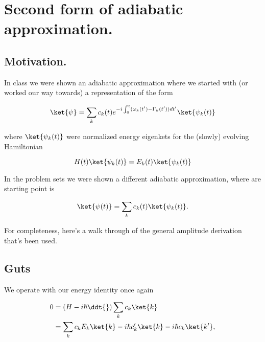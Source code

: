 
%

\chapter{Second form of adiabatic approximation.}
\label{chap:adiabaticApproximation}
{}
\date{Dec 11, 2011}

\beginArtWithToc

\section{Motivation.}

In class we were shown an adiabatic approximation where we started with (or worked our way towards) a representation of the form

\begin{equation}\label{eqn:adiabaticApproximation:10}
\ket{\psi} = \sum_k c_k(t) e^{-i \int_0^t (\omega_k(t') - \Gamma_k(t')) dt' } \ket{\psi_k(t)}
\end{equation}

where $\ket{\psi_k(t)}$ were normalized energy eigenkets for the (slowly) evolving Hamiltonian

\begin{equation}\label{eqn:adiabaticApproximation:30}
H(t) \ket{\psi_k(t)} = E_k(t) \ket{\psi_k(t)}
\end{equation}

In the problem sets we were shown a different adiabatic approximation, where are starting point is 

\begin{equation}\label{eqn:adiabaticApproximation:50}
\ket{\psi(t)} = \sum_k c_k(t) \ket{\psi_k(t)}.
\end{equation}

For completeness, here's a walk through of the general amplitude derivation that's been used.

\section{Guts}

We operate with our energy identity once again

\begin{align*}
0 
&=
\left(H - i \hbar \ddt{} \right) \sum_k c_k \ket{k} \\
&=
\sum_k c_k E_k \ket{k} - i \hbar c_k' \ket{k} - i \hbar c_k \ket{k'} ,
\end{align*}

